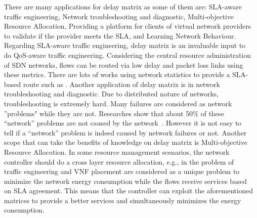 \documentclass[10pt, journal, letterpaper]{IEEEtran}
\begin{document}
 There are many applications for delay matrix as some of them are: SLA-aware traffic engineering, Network troubleshooting and diagnostic, Multi-objective Resource Allocation, Providing a platform for clients of virtual network providers to validate if the provider meets the SLA, and Learning Network Behaviour. Regarding SLA-aware traffic engineering, delay matrix is an invaluable input to do QoS-aware traffic engineering. Considering the central resource administration of SDN networks, flows can be routed via low delay and packet loss links using these metrics. There are lots of works using network statistics to provide a SLA-based route such as \cite{tajiki2017optimal,kamoun2018ip,lin2018dte}. Another application of delay matrix is in network troubleshooting and diagnostic. Due to distributed nature of networks, troubleshooting is extremely hard. Many failures are considered as network ''problems" while they are not. Researches show that about 50$\%$ of these “network” problems are not caused by the network~\cite{guo2015pingmesh}. However it is not easy to tell if a “network” problem is indeed caused by network failures or not. Another scope that can take the benefits of knowledge on delay matrix is Multi-objective Resource Allocation. In some resource management scenarios, the network controller should do a cross layer resource allocation, e.g., in \cite{tajiki2018energy} the problem of traffic engineering and VNF placement are considered as a unique problem to minimize the network energy consumption while the flows receive services based on SLA agreement. This means that the controller can exploit the aforementioned matrices to provide a better services and simultaneously minimizes the energy consumption.
\end{document}
